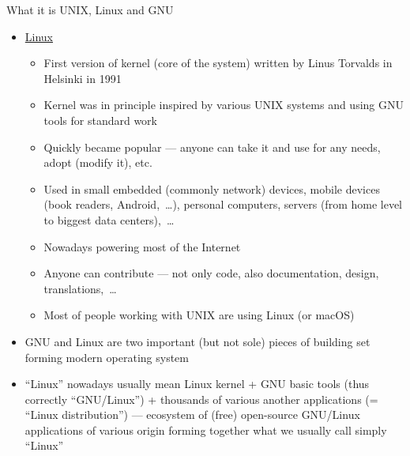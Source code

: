 \documentclass[compress, ucs, xelatex, 11pt, xcolor=svgnames, aspectratio=169,
	hyperref={
		bookmarks=true,
		unicode=true,
		colorlinks=true,
		pdftitle={Linux, command line and MetaCentrum},
		plainpages=false,
		pdfauthor={Vojtech Zeisek},
		pdfsubject={Course about use of Linux command line, writing shell scripts and using MetaCentrum of CESNET},
		pdfcreator={XeLaTeX},
		pdfkeywords={Linux, GNU, BASH, shell, command line, MetaCentrum},
		linkcolor=DarkRed, %
		anchorcolor=DarkBlue, %
		citecolor=Indigo, %
		filecolor=NavyBlue, %
		menucolor=DarkMagenta, %
		urlcolor=DarkBlue, %
		pdftex},
	url={hyphens, lowtilde} %
	]{beamer}
\begin{document}
\begin{frame}[allowframebreaks]{What it is UNIX, Linux and GNU}
\begin{itemize}
		\begin{itemize}
			\item \enquote{GNU's Not Unix!} --- but it is compatible, respects its principles
			\item System written from scratch, following ideas of UNIX
			\item Since 1984 Richard Stallman (founder of \href{https://www.fsf.org/}{Free Software Foundation}) tried to make new kernel (Hurd --- not finished yet\ldots)
			\item Generally set of basic system tools --- working with many kernels (Linux, BSD*, macOS,~\ldots), also present in many commercial paid UNIX systems
			\item Source code is free and open --- anyone can study it (Security!), report bugs, contribute, modify, share it,~\ldots
			\item GNU General Public License (GPL) --- free spirit of open-source --- license, idea, how to share software
			\item Inspired open public software development --- crucial for our usage of Linux \& al.
		\end{itemize}
		\item \href{https://en.wikipedia.org/wiki/Linux}{Linux}
		\begin{itemize}
			\item First version of kernel (core of the system) written by Linus Torvalds in Helsinki in 1991
			\item Kernel was in principle inspired by various UNIX systems and using GNU tools for standard work
			\item Quickly became popular --- anyone can take it and use for any needs, adopt (modify it), etc.
			\item Used in small embedded (commonly network) devices, mobile devices (book readers, Android,~\ldots), personal computers, servers (from home level to biggest data centers),~\ldots
			\item Nowadays powering most of the Internet
			\item Anyone can contribute --- not only code, also documentation, design, translations,~\ldots
			\item Most of people working with UNIX are using Linux (or macOS)
		\end{itemize}
		\item GNU and Linux are two important (but not sole) pieces of building set forming modern operating system
		\item \enquote{Linux} nowadays usually mean Linux kernel + GNU basic tools (thus correctly \enquote{GNU/Linux}) + thousands of various another applications (= \enquote{Linux distribution}) --- ecosystem of (free) open-source GNU/Linux applications of various origin forming together what  we usually call simply \enquote{Linux}

\end{itemize}
\end{frame}
\end{document}
